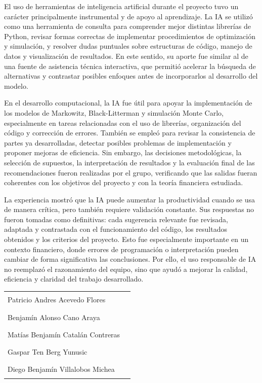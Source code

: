 El uso de herramientas de inteligencia artificial durante el proyecto tuvo un car\'acter principalmente instrumental y de apoyo al aprendizaje. La IA se utiliz\'o como una herramienta de consulta para comprender mejor distintas librer\'ias de Python, revisar formas correctas de implementar procedimientos de optimizaci\'on y simulaci\'on, y resolver dudas puntuales sobre estructuras de c\'odigo, manejo de datos y visualizaci\'on de resultados. En este sentido, su aporte fue similar al de una fuente de asistencia t\'ecnica interactiva, que permiti\'o acelerar la b\'usqueda de alternativas y contrastar posibles enfoques antes de incorporarlos al desarrollo del modelo.

En el desarrollo computacional, la IA fue \'util para apoyar la implementaci\'on de los modelos de Markowitz, Black-Litterman y simulaci\'on Monte Carlo, especialmente en tareas relacionadas con el uso de librer\'ias, organizaci\'on del c\'odigo y correcci\'on de errores. Tambi\'en se emple\'o para revisar la consistencia de partes ya desarrolladas, detectar posibles problemas de implementaci\'on y proponer mejoras de eficiencia. Sin embargo, las decisiones metodol\'ogicas, la selecci\'on de supuestos, la interpretaci\'on de resultados y la evaluaci\'on final de las recomendaciones fueron realizadas por el grupo, verificando que las salidas fueran coherentes con los objetivos del proyecto y con la teor\'ia financiera estudiada.

La experiencia mostr\'o que la IA puede aumentar la productividad cuando se usa de manera cr\'itica, pero tambi\'en requiere validaci\'on constante. Sus respuestas no fueron tomadas como definitivas: cada sugerencia relevante fue revisada, adaptada y contrastada con el funcionamiento del c\'odigo, los resultados obtenidos y los criterios del proyecto. Esto fue especialmente importante en un contexto financiero, donde errores de programaci\'on o interpretaci\'on pueden cambiar de forma significativa las conclusiones. Por ello, el uso responsable de IA no reemplaz\'o el razonamiento del equipo, sino que ayud\'o a mejorar la calidad, eficiencia y claridad del trabajo desarrollado.


\vspace{0.25cm}

\begin{center}
\begin{tabular}{p{7cm}l}
Patricio Andres Acevedo Flores & \rule{5cm}{0.4pt} \\[0.55cm]
Benjamín Alonso Cano Araya & \rule{5cm}{0.4pt} \\[0.55cm]
Matías Benjamín Catalán Contreras & \rule{5cm}{0.4pt} \\[0.55cm]
Gaspar Ten Berg Yunusic & \rule{5cm}{0.4pt} \\[0.55cm]
Diego Benjamín Villalobos Michea & \rule{5cm}{0.4pt}
\end{tabular}
\end{center}
